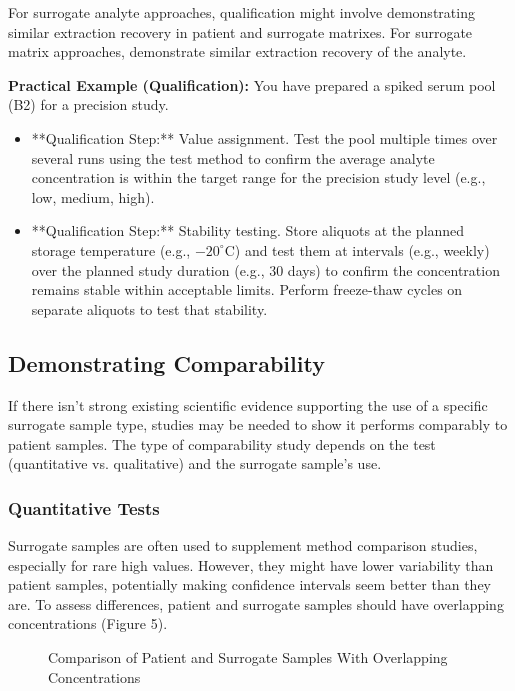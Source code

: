 \documentclass{article}
\begin{document}
For surrogate analyte approaches, qualification might involve demonstrating similar extraction recovery in patient and surrogate matrixes. For surrogate matrix approaches, demonstrate similar extraction recovery of the analyte.

\textbf{Practical Example (Qualification):}
You have prepared a spiked serum pool (B2) for a precision study.
\begin{itemize}
    \item **Qualification Step:** Value assignment. Test the pool multiple times over several runs using the test method to confirm the average analyte concentration is within the target range for the precision study level (e.g., low, medium, high).
    \item **Qualification Step:** Stability testing. Store aliquots at the planned storage temperature (e.g., $-20^\circ$C) and test them at intervals (e.g., weekly) over the planned study duration (e.g., 30 days) to confirm the concentration remains stable within acceptable limits. Perform freeze-thaw cycles on separate aliquots to test that stability.
\end{itemize}

\subsection{Demonstrating Comparability}

If there isn't strong existing scientific evidence supporting the use of a specific surrogate sample type, studies may be needed to show it performs comparably to patient samples. The type of comparability study depends on the test (quantitative vs. qualitative) and the surrogate sample's use.

\subsubsection{Quantitative Tests}

Surrogate samples are often used to supplement method comparison studies, especially for rare high values. However, they might have lower variability than patient samples, potentially making confidence intervals seem better than they are. To assess differences, patient and surrogate samples should have overlapping concentrations (Figure 5).

\begin{figure}[h!]
    \centering
    \caption{Comparison of Patient and Surrogate Samples With Overlapping Concentrations \cite{CLSIEP39Ed1E}}
\end{figure}
\end{document}
